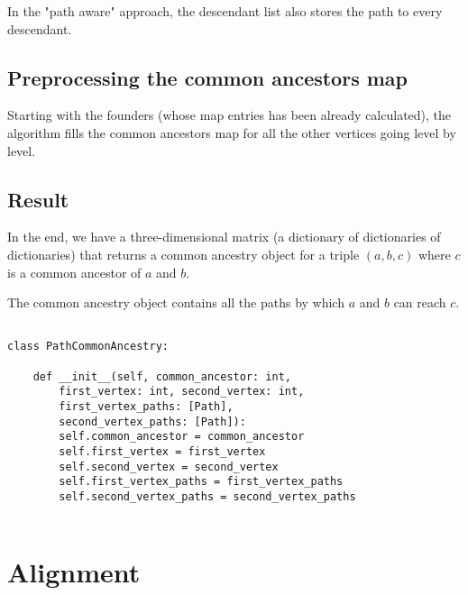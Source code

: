 \documentclass[14pt]{extarticle}
\begin{document}
In the "path aware" approach, the descendant list also stores the path to every descendant.

\subsection{Preprocessing the common ancestors map}

Starting with the founders (whose map entries has been already calculated), the algorithm fills the common ancestors map for all the other vertices going level by level.

\subsection{Result}

In the end, we have a three-dimensional matrix (a dictionary of dictionaries of dictionaries) that returns a common ancestry object for a triple $(a, b, c)$ where $c$ is a common ancestor of $a$ and $b$.

The common ancestry object contains all the paths by which $a$ and $b$ can reach $c$.

\begin{lstlisting}

class PathCommonAncestry:
	
	def __init__(self, common_ancestor: int,
		first_vertex: int, second_vertex: int,
		first_vertex_paths: [Path],
		second_vertex_paths: [Path]):
		self.common_ancestor = common_ancestor
		self.first_vertex = first_vertex
		self.second_vertex = second_vertex
		self.first_vertex_paths = first_vertex_paths
		self.second_vertex_paths = second_vertex_paths
	

\end{lstlisting}

\newpage

\section{Alignment}

\vspace*{-\baselineskip}
\end{document}
